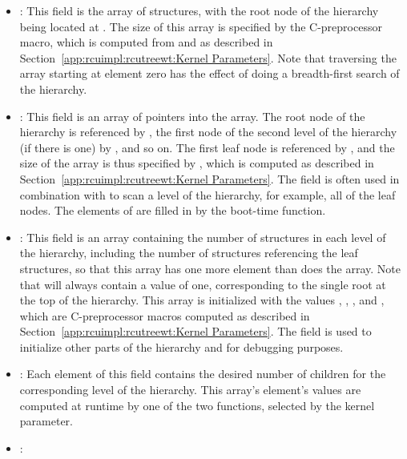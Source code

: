 \begin{itemize}
\item	{}:
	This field is the array of  structures,
	with the root node of the hierarchy being located at
	.
	The size of this array is specified by the
	 C-preprocessor macro, which is computed
	from  and 
	as described in
	Section~\ref{app:rcuimpl:rcutreewt:Kernel Parameters}.
	Note that traversing the  array starting at
	element zero has the effect of doing a breadth-first search
	of the  hierarchy.
\item	{}:
	This field is an array of pointers into the  array.
	The root node of the hierarchy is referenced by
	, the first node of the second level of
	the hierarchy (if there is one) by , and so on.
	The first leaf node is referenced by
	, and the size of the 
	array is thus specified by , which is
	computed as described in
	Section~\ref{app:rcuimpl:rcutreewt:Kernel Parameters}.
	The  field is often used in combination with
	 to scan a level of the  hierarchy,
	for example, all of the leaf nodes.
	The elements of  are filled in by the
	boot-time  function.
\item	{}:
	This field is an array containing the number of 
	structures in each level of the hierarchy, including the
	number of  structures referencing the leaf
	 structures, so that this array has one more
	element than does the  array.
	Note that  will always contain a value of
	one, corresponding to the single root  at the
	top of the hierarchy.
	This array is initialized with the values
	,
	,
	, and
	,
	which are C-preprocessor macros computed as described in
	Section~\ref{app:rcuimpl:rcutreewt:Kernel Parameters}.
	The  field is used to initialize
	other parts of the hierarchy and for debugging purposes.
\item	{}:
	Each element of this field contains the desired number of children
	for the corresponding level of the  hierarchy.
	This array's element's values are computed at runtime
	by one of the two  functions,
	selected by the  kernel parameter.
\item	{}:

\end{itemize}
